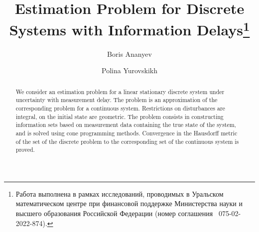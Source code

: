 \begin{englishtitle} %
\title{Estimation Problem for Discrete Systems with Information Delays\thanks{Работа выполнена в рамках исследований, проводимых в Уральском математическом центре
при финансовой поддержке Министерства науки и высшего образования Российской Федерации
(номер соглашения \textnumero~075-02-2022-874).}}
\author{Boris Ananyev  \and Polina Yurovskikh 
}

\maketitle
\begin{abstract}
We consider an estimation problem for a linear stationary discrete system under
uncertainty with measurement delay. The problem is an approximation of the
corresponding problem for a continuous system. Restrictions on disturbances are
integral, on the initial state are geometric. The problem consists in constructing
information sets based on measurement data containing the true state of the system, and
is solved using cone programming methods. Convergence in the Hausdorff metric of the
set of the discrete problem to the corresponding set of the continuous system is
proved.
\end{abstract}
\end{englishtitle}

\iffalse


\documentclass[12pt]{llncs}
\usepackage[T2A]{fontenc}
\usepackage[utf8]{inputenc}
\usepackage[english,russian]{babel}
\usepackage[russian]{nla}
\usepackage[active]{srcltx}

\fi

